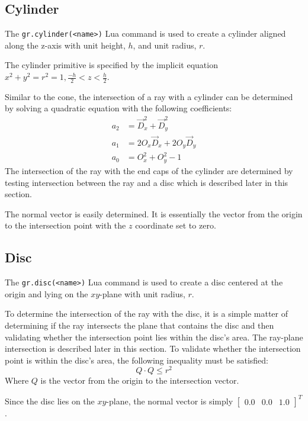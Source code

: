\subsection*{Cylinder}
The \verb|gr.cylinder(<name>)| Lua command is used to create a cylinder aligned
along the z-axis with unit height, $h$, and unit radius, $r$.

The cylinder primitive is specified by the implicit equation $x^2 + y^2 = r^2 =
1, \frac{-h}{2} < z < \frac{h}{2}$.

Similar to the cone, the intersection of a ray with a cylinder can be determined
by solving a quadratic equation with the following coefficients:
\begin{equation}
\begin{split}
  a_{2} &= \vec{D}_{x}^2 + \vec{D}_{y}^2 \\
  a_{1} &= 2O_{x}\vec{D}_{x} + 2O_{y}\vec{D}_{y} \\
  a_{0} &= O_{x}^2 + O_{y}^2 - 1
\end{split}
\end{equation}
The intersection of the ray with the end caps of the cylinder are determined by
testing intersection between the ray and a disc which is described later in this
section.

The normal vector is easily determined. It is essentially the vector from the
origin to the intersection point with the $z$ coordinate set to zero.

\subsection*{Disc}
The \verb|gr.disc(<name>)| Lua command is used to create a disc centered at the
origin and lying on the $xy$-plane with unit radius, $r$.

To determine the intersection of the ray with the disc, it is a simple matter of
determining if the ray intersects the plane that contains the disc and then
validating whether the intersection point lies within the disc's area. The
ray-plane intersection is described later in this section. To validate whether
the intersection point is within the disc's area, the following inequality must
be satisfied:
\begin{equation}
  Q\cdot Q \leq r^2
\end{equation}
Where $Q$ is the vector from the origin to the intersection vector.

Since the disc lies on the $xy$-plane, the normal vector is simply \newline
$\begin{bmatrix} 0.0 & 0.0 & 1.0
\end{bmatrix}^{T}$.

